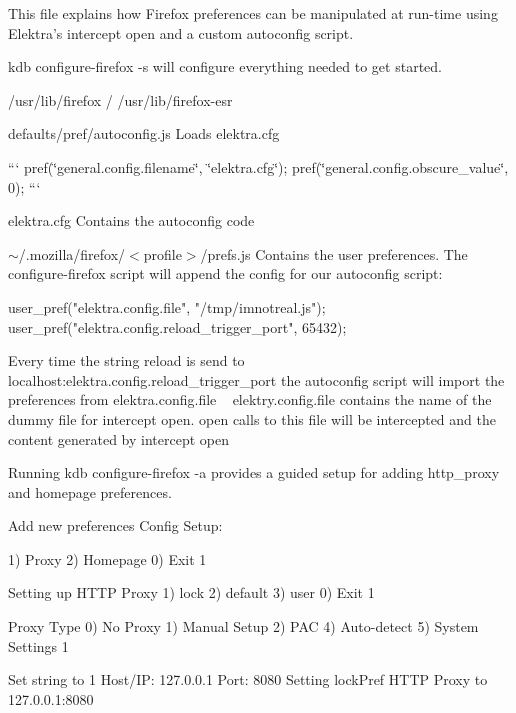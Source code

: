 This file explains how Firefox preferences can be manipulated at run-\/time using Elektra’s intercept open and a custom autoconfig script.

{\ttfamily kdb configure-\/firefox -\/s} will configure everything needed to get started.


\begin{DoxyItemize}
\item {\ttfamily /usr/lib/firefox} / {\ttfamily /usr/lib/firefox-\/esr}
\begin{DoxyItemize}
\item {\ttfamily defaults/pref/autoconfig.\+js} Loads {\ttfamily elektra.\+cfg}

``` pref(\char`\"{}general.\+config.\+filename\char`\"{}, \char`\"{}elektra.\+cfg\char`\"{}); pref(\char`\"{}general.\+config.\+obscure\+\_\+value\char`\"{}, 0); ```
\item {\ttfamily elektra.\+cfg} Contains the autoconfig code
\end{DoxyItemize}
\item {\ttfamily $\sim$/.mozilla/firefox/$<$profile$>$/prefs.js} Contains the user preferences. The configure-\/firefox script will append the config for our autoconfig script\+:
\end{DoxyItemize}


\begin{DoxyCode}
user\_pref("elektra.config.file", "/tmp/imnotreal.js");
user\_pref("elektra.config.reload\_trigger\_port", 65432);
\end{DoxyCode}


Every time the string {\ttfamily reload} is send to localhost\+:{\ttfamily elektra.\+config.\+reload\+\_\+trigger\+\_\+port} the autoconfig script will import the preferences from {\ttfamily elektra.\+config.\+file} ~\newline
 {\ttfamily elektry.\+config.\+file} contains the name of the dummy file for {\ttfamily intercept open}. {\ttfamily open} calls to this file will be intercepted and the content generated by {\ttfamily intercept open}

Running {\ttfamily kdb configure-\/firefox -\/a} provides a guided setup for adding http\+\_\+proxy and homepage preferences.


\begin{DoxyCode}
Add new preferences
Config Setup:

1) Proxy
2) Homepage
0) Exit
1

Setting up HTTP Proxy
1) lock
2) default
3) user
0) Exit
1

Proxy Type
0) No Proxy
1) Manual Setup
2) PAC
4) Auto-detect
5) System Settings
1

Set string to 1
Host/IP: 127.0.0.1
Port: 8080
Setting lockPref HTTP Proxy to 127.0.0.1:8080
\end{DoxyCode}


